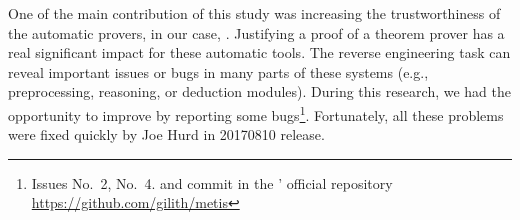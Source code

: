 \documentclass[../main.tex]{subfiles}
\begin{document}
One of the main contribution of this study was
increasing the trustworthiness of the automatic provers,
in our case, \Metis.
Justifying a proof of a theorem prover
has a real significant impact for these automatic tools.
The reverse engineering task can reveal important issues or bugs
in many parts of these systems (e.g., preprocessing, reasoning, or
deduction modules). During this research, we had the opportunity
to improve \Metis by reporting some bugs\footnote{Issues No.~2,
No.~4. and commit  in the \Metis' official repository
\url{https://github.com/gilith/metis}}.
Fortunately, all these problems were fixed quickly by Joe Hurd in
20170810 release.
\end{document}
